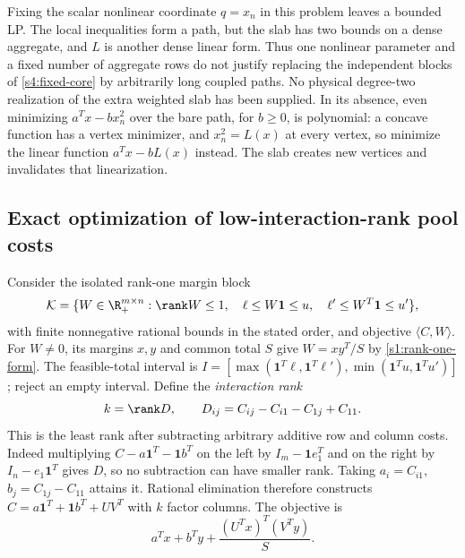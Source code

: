 Fixing the scalar nonlinear coordinate $q=x_n$ in this problem leaves
a bounded LP. The local inequalities form a path, but the slab has two
bounds on a dense aggregate, and $L$ is another dense linear form.
Thus one nonlinear parameter and a fixed number of aggregate rows do
not justify replacing the independent blocks of \cref{s4:fixed-core}
by arbitrarily long coupled paths. No physical degree-two realization
of the extra weighted slab has been supplied. In its absence, even
minimizing $a^Tx-bx_n^2$ over the bare path, for $b\ge0$, is polynomial:
a concave function has a vertex minimizer, and $x_n^2=L(x)$ at every
vertex, so minimize the linear function $a^Tx-bL(x)$ instead. The slab
creates new vertices and invalidates that linearization.

\subsection{Exact optimization of low-interaction-rank pool costs}
\label{s6:low-rank}
Consider the isolated rank-one margin block
\begin{equation}
 \mathcal K=\{W\in\R_+^{m\times n}:\rank W\le1,\quad
 \ell\le W\mathbf1\le u,\quad
 \ell'\le W^T\mathbf1\le u'\},\label{s6:margin-block}
\end{equation}
with finite nonnegative rational bounds in the stated order, and objective
$\langle C,W\rangle$. For $W\ne0$, its margins $x,y$ and common total
$S$ give $W=xy^T/S$ by \eqref{s1:rank-one-form}.
The feasible-total interval is
$I=[\max(\mathbf1^T\ell,\mathbf1^T\ell'),
\min(\mathbf1^Tu,\mathbf1^Tu')]$; reject an empty interval.
Define the \emph{interaction rank}
\[
 k=\rank D,\qquad D_{ij}=C_{ij}-C_{i1}-C_{1j}+C_{11}.
\]
This is the least rank after subtracting arbitrary additive row and
column costs. Indeed multiplying $C-a\mathbf1^T-\mathbf1b^T$ on the
left by $I_m-\mathbf1e_1^T$ and on the right by $I_n-e_1\mathbf1^T$
gives $D$, so no subtraction can have smaller rank. Taking
$a_i=C_{i1}$, $b_j=C_{1j}-C_{11}$ attains it.
Rational elimination therefore constructs
$C=a\mathbf1^T+\mathbf1b^T+UV^T$ with $k$ factor columns.
The objective is
\begin{equation}
 a^Tx+b^Ty+\frac{(U^Tx)^T(V^Ty)}S.\label{s6:interaction-objective}
\end{equation}

